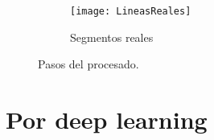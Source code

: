 \begin{figure}
	\begin{subfigure}{.33\linewidth}
	\centering\large \texttt{[image: LineasReales]}
	\caption{Segmentos reales}\label{fig:2.1.13}
	\end{subfigure}%
	
\caption{Pasos del procesado.}\label{fig:2.1}
\end{figure}








\section{Por deep learning}
